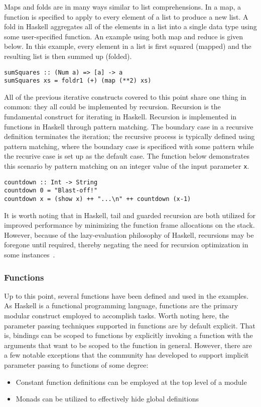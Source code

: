 \documentclass[titlepage,12pt]{article}
\newcommand{\bi}{\begin{itemize}}
\newcommand{\ei}{\end{itemize}}
\begin{document}
Maps and folds are in many ways similar to list comprehensions.  In a map, a function is specified to apply to
every element of a list to produce a new list.  A fold in Haskell aggregates all of the elements in a list into
a single data type using some user-specified function.  An example using both map and reduce is given below.
In this example, every element in a list is first squared (mapped) and the resulting list is then summed up (folded).
\begin{verbatim}
sumSquares :: (Num a) => [a] -> a
sumSquares xs = foldr1 (+) (map (**2) xs)
\end{verbatim}

All of the previous iterative constructs covered to this point share one thing in common:
they all could be implemented by recursion.  Recursion is the fundamental construct for iterating
in Haskell.  Recursion is implemented in functions in Haskell through pattern matching.  The boundary
case in a recursive definition terminates the iteration; the recursive process is typically defined using pattern matching,
where the boundary case is specificed with some pattern while the recurive case is set up as the default case.
The function below demonstrates this scenario by pattern matching on an integer value of the input parameter \texttt{x}.
\begin{verbatim}
countdown :: Int -> String
countdown 0 = "Blast-off!"
countdown x = (show x) ++ "...\n" ++ countdown (x-1)
\end{verbatim}

It is worth noting that in Haskell, tail and guarded recursion are both utilized for improved performance 
by minimizing the function frame allocations on the stack.  However, because of the lazy-evaluation philosophy of Haskell,
recursions may be foregone until required, thereby negating the need for recursion optimization in some instances~\cite{haskell-tail-recur}.

\subsubsection{Functions}

Up to this point, several functions have been defined and used in the examples.  As Haskell is a functional programming
language, functions are the primary modular construct employed to accomplish tasks.  Worth noting here, the parameter passing techniques
supported in functions are by default explicit.  That is, bindings can be scoped to functions by explicitly invoking a function
with the arguments that want to be scoped to the function in general.  However, there are a few notable exceptions that the community
has developed to support implicit parameter passing to functions of some degree:
\bi
    \item Constant function definitions can be employed at the top level of a module~\cite{haskell-implicit-params}
    \item Monads can be utilized to effectively hide global definitions~\cite{haskell-implicit-params}
\ei
\end{document}
